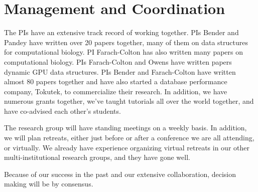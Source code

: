 \section*{Management and Coordination}




The PIs have an extensive track record of working together.  PIs Bender and Pandey have written over 20 papers together, many of them on data structures for computational biology.  PI Farach-Colton has also written many papers on computational biology.  PIs Farach-Colton and Owens have written papers dynamic GPU data structures.  PIs Bender and Farach-Colton have written almost 80 papers together and have also started a database performance company, Tokutek, to commercialize their research.  In addition, we have numerous grants together, we've taught tutorials all over the world together, and have co-advised each other's students. 

The research group will have standing meetings on a weekly basis.  In addition, we will plan retreats, either just before or after a conference we are all attending, or virtually.  We already have experience organizing virtual retreats in our other multi-institutional research groups, and they have gone well.

Because of our success in the past and our extensive collaboration, decision making will be by consensus.  